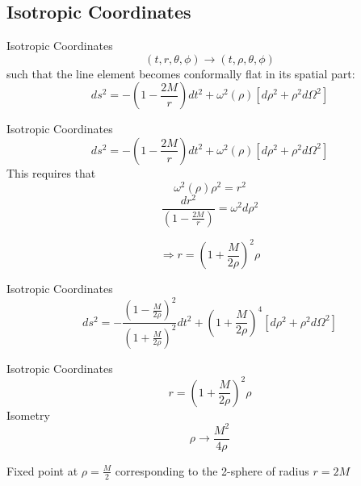 \documentclass{beamer}
\begin{document}
	\subsection{Isotropic Coordinates}
    	\begin{frame}{Isotropic Coordinates}
    		$$ (t, r, \theta, \phi) \longrightarrow (t, \rho, \theta, \phi) $$
            such that the line element becomes conformally flat in its spatial part:
            \pause
        	$$ ds^2=-\left( 1 - \frac{2M}{r} \right) dt^2 + 	
            \omega^2\left( \rho \right) \left[ d\rho^{2} + \rho^{2} d\Omega^{2} \right] $$
    	\end{frame}
        
        \begin{frame}{Isotropic Coordinates}
        	$$ ds^2=-\left( 1 - \frac{2M}{r} \right) dt^2 + 	
            \omega^2\left( \rho \right) \left[ d\rho^{2} + \rho^{2} 
            d\Omega^{2} \right] $$
            This requires that
            \pause
            $$\omega^2\left(\rho\right)\rho^2 = r^2$$
            \pause
            $$ \frac{dr^2}{\left( 1 - \frac{2M}{r} \right)} = \omega^2 d\rho^2 $$

            \bigskip
            
            $$\Longrightarrow r = \left( 1 + \frac{M}{2\rho} \right)^2 \rho$$
    	\end{frame}
        
        \begin{frame}{Isotropic Coordinates}
        	$$ ds^2 = -\frac{\left(1-\frac{M}{2\rho} \right)^2}{\left(1+\frac{M}
            {2\rho}\right)^2}dt^2 + \left(1+\frac{M}{2\rho}\right)^4 
            \left[d\rho^2 + \rho^2 d\Omega^2 \right]$$
    	\end{frame}
        
        \begin{frame}{Isotropic Coordinates}
        	$$ r = \left( 1 + \frac{M}{2\rho} \right)^2 \rho $$
            \pause
            Isometry
			$$ \rho \longrightarrow \frac{M^{2}}{4\rho} $$
            \pause
            \bigskip
            
            Fixed point at $\rho=\frac{M}{2}$ corresponding to the 2-sphere of radius $r=2M$
    	\end{frame}
        
\end{document}
